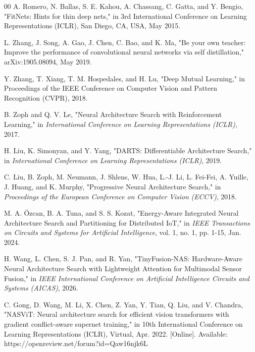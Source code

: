 \documentclass[conference]{IEEEtran}
\begin{document}
\begin{thebibliography}{00}
		A. Romero, N. Ballas, S. E. Kahou, A. Chassang, C. Gatta, and Y. Bengio, "FitNets: Hints for thin deep nets," in 3rd International Conference on Learning Representations (ICLR), San Diego, CA, USA, May 2015.
		
		L. Zhang, J. Song, A. Gao, J. Chen, C. Bao, and K. Ma, "Be your own teacher: Improve the performance of convolutional neural networks via self distillation," arXiv:1905.08094, May 2019.
		
		Y. Zhang, T. Xiang, T. M. Hospedales, and H. Lu, "Deep Mutual Learning," in Proceedings of the IEEE Conference on Computer Vision and Pattern Recognition (CVPR), 2018.
		
		B. Zoph and Q. V. Le, "Neural Architecture Search with Reinforcement Learning," in \textit{International Conference on Learning Representations (ICLR)}, 2017.
		
		H. Liu, K. Simonyan, and Y. Yang, "DARTS: Differentiable Architecture Search," in \textit{International Conference on Learning Representations (ICLR)}, 2019.
		
		C. Liu, B. Zoph, M. Neumann, J. Shlens, W. Hua, L.-J. Li, L. Fei-Fei, A. Yuille, J. Huang, and K. Murphy, "Progressive Neural Architecture Search," in \textit{Proceedings of the European Conference on Computer Vision (ECCV)}, 2018.
		
		M. A. Özcan, B. A. Tuna, and S. S. Kozat, "Energy-Aware Integrated Neural Architecture Search and Partitioning for Distributed IoT," in \textit{IEEE Transactions on Circuits and Systems for Artificial Intelligence}, vol. 1, no. 1, pp. 1-15, Jan. 2024.
		
		H. Wang, L. Chen, S. J. Pan, and R. Yan, "TinyFusion-NAS: Hardware-Aware Neural Architecture Search with Lightweight Attention for Multimodal Sensor Fusion," in \textit{IEEE International Conference on Artificial Intelligence Circuits and Systems (AICAS)}, 2026.
		
		C. Gong, D. Wang, M. Li, X. Chen, Z. Yan, Y. Tian, Q. Liu, and V. Chandra, "NASViT: Neural architecture search for efficient vision transformers with gradient conflict-aware supernet training," in 10th International Conference on Learning Representations (ICLR), Virtual, Apr. 2022. [Online]. Available: https://openreview.net/forum?id=Qaw16njk6L
		

\end{thebibliography}
\end{document}
